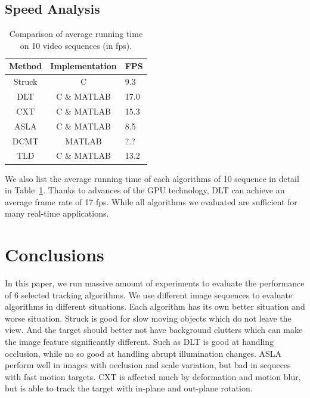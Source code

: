 \documentclass{acm_proc_article-sp}
\begin{document}
\subsection{Speed Analysis}

\begin{table}
	\centering
	\begin{tabular}{|c|c|l|} \hline
		Method & Implementation & FPS\\ \hline
		Struck & C & 9.3\\ \hline
		DLT & C \& MATLAB & 17.0\\ \hline
		CXT & C \& MATLAB & 15.3\\ \hline
		ASLA & C \& MATLAB & 8.5\\ \hline
		DCMT & MATLAB & ?.?\\ \hline
		TLD & C \& MATLAB & 13.2\\ \hline
	\end{tabular}
	\caption{Comparison of average running time on 10 video sequences (in fps).}
	\label{table:time}
\end{table}

We also list the average running time of each algorithms of 10 sequence in detail in Table~\ref{table:time}. Thanks to advances of the GPU technology, DLT can achieve an average frame rate of 17 fps. While all algorithms we evaluated are sufficient for many real-time applications.

\section{Conclusions}
In this paper, we run massive amount of experiments to evaluate the performance of 6 selected tracking algorithms.
We use different image sequences to evaluate algorithms in different situations.
Each algorithm has its own better situation and worse situation.
Struck is good for slow moving objects which do not leave the view. And the target should better not have background clutters which can make the image feature significantly different.
Such as DLT is good at handling occlusion, while no so good at handling abrupt illumination changes.
ASLA perform well in images with occlusion and scale variation, but bad in sequeces with fast motion targets.
CXT is affected much by deformation and motion blur, but is able to track the target with in-plane and out-plane rotation.
\end{document}
